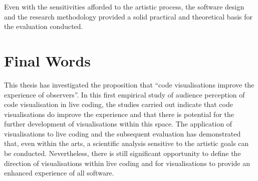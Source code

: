 Even with the sensitivities afforded to the artistic process, the software design and the research methodology provided a solid practical and theoretical basis for the evaluation conducted. \more



\section{Final Words}

This thesis has investigated the proposition that ``code visualisations improve the experience of observers''. In this first empirical study of audience perception of code visualisation in live coding, the studies carried out indicate that code visualisations do improve the experience and that there is potential for the further development of visualisations within this space. The application of visualisations to live coding and the subsequent evaluation has demonstrated that, even within the arts, a scientific analysis sensitive to the artistic goals can be conducted. Nevertheless, there is still significant opportunity to define the direction of visualisations within live coding and for visualisations to provide an enhanced experience of all software.




